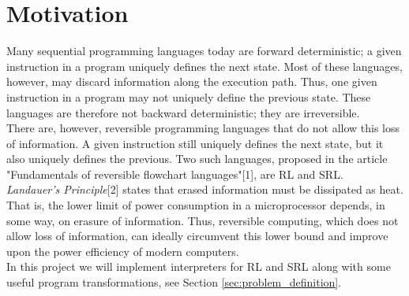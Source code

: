\section*{Motivation}
\label{sec:motivation}
Many sequential programming languages today are forward deterministic; a given instruction in a program uniquely defines the next state. Most of these languages, however, may discard information along the execution path. Thus, one given instruction in a program may not uniquely define the previous state. These languages are therefore not backward deterministic; they are irreversible. \\
\indent There are, however, reversible programming languages that do not allow this loss of information. A given instruction still uniquely defines the next state, but it also uniquely defines the previous. Two such languages, proposed in the article "Fundamentals of reversible flowchart languages"[1], are RL and SRL. \\
\indent \textit{Landauer's Principle}[2] states that erased information must be dissipated as heat. That is, the lower limit of power consumption in a microprocessor depends, in some way, on erasure of information. Thus, reversible computing, which does not allow loss of information, can ideally circumvent this lower bound and improve upon the power efficiency of modern computers. \\
\indent In this project we will implement interpreters for RL and SRL along with some useful program transformations, see Section \ref{sec:problem_definition}.
